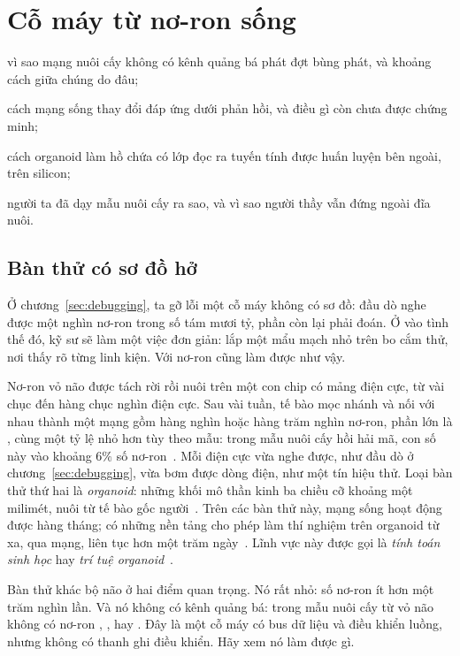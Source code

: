 \chapter{Cỗ máy từ nơ-ron sống}
\label{sec:livingmachine}
\begin{chaptergoals}
\item vì sao mạng nuôi cấy không có kênh quảng bá phát đợt bùng phát, và khoảng cách giữa chúng do đâu;
\item cách mạng sống thay đổi đáp ứng dưới phản hồi, và điều gì còn chưa được chứng minh;
\item cách organoid làm hồ chứa có lớp đọc ra tuyến tính được huấn luyện bên ngoài, trên silicon;
\item người ta đã dạy mẫu nuôi cấy ra sao, và vì sao người thầy vẫn đứng ngoài đĩa nuôi.
\end{chaptergoals}

\section{Bàn thử có sơ đồ hở}

Ở chương~\ref{sec:debugging}, ta gỡ lỗi một cỗ máy không có sơ đồ: đầu dò nghe được một nghìn nơ-ron trong số tám mươi tỷ, phần còn lại phải đoán. Ở vào tình thế đó, kỹ sư sẽ làm một việc đơn giản: lắp một mẩu mạch nhỏ trên bo cắm thử, nơi thấy rõ từng linh kiện. Với nơ-ron cũng làm được như vậy.

Nơ-ron vỏ não được tách rời rồi nuôi trên một con chip có mảng điện cực, từ vài chục đến hàng chục nghìn điện cực. Sau vài tuần, tế bào mọc nhánh và nối với nhau thành một mạng gồm hàng nghìn hoặc hàng trăm nghìn nơ-ron, phần lớn là , cùng một tỷ lệ nhỏ hơn  tùy theo mẫu: trong mẫu nuôi cấy hồi hải mã, con số này vào khoảng $6\%$ số nơ-ron~\cite{Benson1994}. Mỗi điện cực vừa nghe được, như đầu dò ở chương~\ref{sec:debugging}, vừa bơm được dòng điện, như một tín hiệu thử. Loại bàn thử thứ hai là \emph{organoid}: những khối mô thần kinh ba chiều cỡ khoảng một milimét, nuôi từ tế bào gốc người~\cite{Lancaster2013}. Trên các bàn thử này, mạng sống hoạt động được hàng tháng; có những nền tảng cho phép làm thí nghiệm trên organoid từ xa, qua mạng, liên tục hơn một trăm ngày~\cite{Jordan2024}. Lĩnh vực này được gọi là \emph{tính toán sinh học} hay \emph{trí tuệ organoid}~\cite{Smirnova2023}.

Bàn thử khác bộ não ở hai điểm quan trọng. Nó rất nhỏ: số nơ-ron ít hơn một trăm nghìn lần. Và nó không có kênh quảng bá: trong mẫu nuôi cấy từ vỏ não không có nơ-ron , ,  hay . Đây là một cỗ máy có bus dữ liệu và điều khiển luồng, nhưng không có thanh ghi điều khiển. Hãy xem nó làm được gì.

